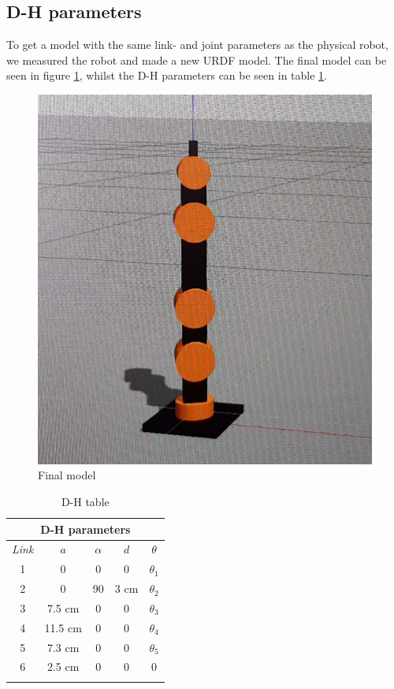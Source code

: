 \documentclass[11pt,a4paper, titlepage]{article}
\begin{document}
	\subsection{D-H parameters}
	To get a model with the same link- and joint parameters as the physical robot, we measured the robot and made a new URDF model. The final model can be seen in figure \ref{fig:urdf-final}, whilst the D-H parameters can be seen in table \ref{DH-table}.
	
	\begin{figure}[H]
		\centering
		\includegraphics[width=0.7\linewidth]{../Diagrams/URDF-final.png}
		
		\caption{Final model}
		\label{fig:urdf-final}
	\end{figure}	
		
	\begin{center}           
    \begin{longtable}{| c | c | c | c | c |}
              \hline
                       
\multicolumn{5}{|c|}{\textbf{D-H parameters}} \\ \hline \endhead
\textit{Link} & \textbf{$a$} & \textbf{$\alpha$} & $d$ & \textbf{$\theta$} \\ \hline             
               1 & 0 & 0 &  0 & $\theta_1$ \\ \hline
               2 & 0 & 90 & 3 cm & $\theta_2$ \\ \hline
               3 & 7.5 cm & 0 & 0 & $\theta_3$ \\ \hline
               4 & 11.5 cm & 0 & 0 & $\theta_4$ \\ \hline
               5 & 7.3 cm & 0 & 0 & $\theta_5$ \\ \hline
               6 & 2.5 cm & 0 & 0 & 0 \\ \hline
               
\caption{D-H table}
\label{DH-table}                                       
\end{longtable}
\end{center}
\end{document}
